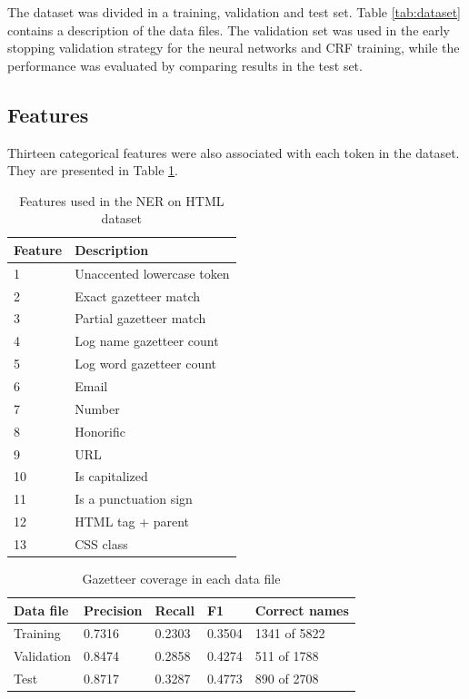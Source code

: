 \documentclass[sigconf]{acmart}
\begin{document}
The dataset was divided in a training, validation and test set. Table \ref{tab:dataset} contains
a description of the data files. The validation set was used in the early stopping validation strategy
for the neural networks and CRF training, while the performance was evaluated by comparing results in the test set.

\subsection{Features}

Thirteen categorical features were also associated with each token in the dataset. They 
are presented in Table \ref{tab:features}.

\begin{table}[h]
  \small
  \begin{center}
    \begin{tabular}{ ll }
      \toprule
      Feature & Description \\
      \midrule
      1  & Unaccented lowercase token \\
      2  & Exact gazetteer match \\
      3  & Partial gazetteer match \\
      4  & Log name gazetteer count\\
      5  & Log word gazetteer count\\
      6  & Email \\
      7  & Number \\
      8  & Honorific \\
      9  & URL \\
      10 & Is capitalized \\
      11 & Is a punctuation sign \\
      12 & HTML tag + parent \\
      13 & CSS class \\
      \bottomrule
    \end{tabular}
  \end{center}
  \caption{Features used in the NER on HTML dataset}
  \label{tab:features}
\end{table}

\begin{table}[h]
  \small
  \begin{center}
    \begin{tabular}{ lllll }
      \toprule
      Data file & Precision & Recall & F1 & Correct names \\
      \midrule
      Training   & 0.7316 & 0.2303 & 0.3504 & 1341 of 5822 \\ 
      Validation & 0.8474 & 0.2858 & 0.4274 & 511 of 1788 \\ 
      Test       & 0.8717 & 0.3287 & 0.4773 & 890 of 2708 \\ 
      \bottomrule
    \end{tabular}
  \end{center}
  \caption{Gazetteer coverage in each data file}
  \label{tab:gazetteer}
\end{table}
\end{document}
